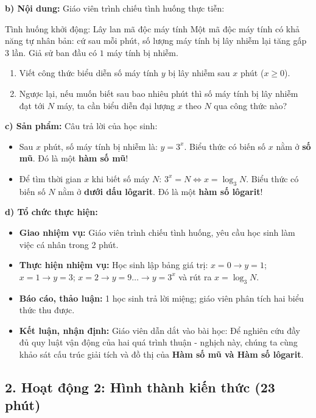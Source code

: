 \documentclass[12pt, a4paper]{article}
\begin{document}
\noindent \textbf{b) Nội dung:}
Giáo viên trình chiếu tình huống thực tiễn:
\begin{pedabox}{Tình huống khởi động: Lây lan mã độc máy tính}
Một mã độc máy tính có khả năng tự nhân bản: cứ sau mỗi phút, số lượng máy tính bị lây nhiễm lại tăng gấp $3$ lần. Giả sử ban đầu có $1$ máy tính bị nhiễm.
\begin{enumerate}[leftmargin=0.6cm]
    \item Viết công thức biểu diễn số máy tính $y$ bị lây nhiễm sau $x$ phút ($x \ge 0$).
    \item Ngược lại, nếu muốn biết sau bao nhiêu phút thì số máy tính bị lây nhiễm đạt tới $N$ máy, ta cần biểu diễn đại lượng $x$ theo $N$ qua công thức nào?
\end{enumerate}
\end{pedabox}

\noindent \textbf{c) Sản phẩm:}
Câu trả lời của học sinh:
\begin{itemize}
    \item Sau $x$ phút, số máy tính bị nhiễm là: $y = 3^x$. Biểu thức có biến số $x$ nằm ở \textbf{số mũ}. Đó là một \textbf{hàm số mũ}!
    \item Để tìm thời gian $x$ khi biết số máy $N$: $3^x = N \iff x = \log_3 N$. Biểu thức có biến số $N$ nằm ở \textbf{dưới dấu lôgarit}. Đó là một \textbf{hàm số lôgarit}!
\end{itemize}

\noindent \textbf{d) Tổ chức thực hiện:}
\begin{itemize}[leftmargin=0.6cm]
    \item \textbf{Giao nhiệm vụ:} Giáo viên trình chiếu tình huống, yêu cầu học sinh làm việc cá nhân trong 2 phút.
    \item \textbf{Thực hiện nhiệm vụ:} Học sinh lập bảng giá trị: $x=0 \to y=1$; $x=1 \to y=3$; $x=2 \to y=9 \dots \to y = 3^x$ và rút ra $x = \log_3 N$.
    \item \textbf{Báo cáo, thảo luận:} 1 học sinh trả lời miệng; giáo viên phân tích hai biểu thức thu được.
    \item \textbf{Kết luận, nhận định:} Giáo viên dẫn dắt vào bài học: Để nghiên cứu đầy đủ quy luật vận động của hai quá trình thuận - nghịch này, chúng ta cùng khảo sát cấu trúc giải tích và đồ thị của \textbf{Hàm số mũ và Hàm số lôgarit}.
\end{itemize}

\subsection*{2. Hoạt động 2: Hình thành kiến thức (23 phút)}
\end{document}
